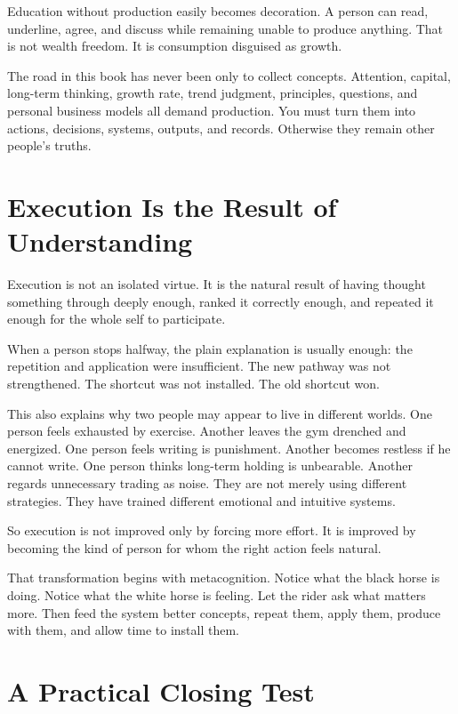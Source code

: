 Education without production easily becomes decoration. A person can read, underline, agree, and discuss while remaining unable to produce anything. That is not wealth freedom. It is consumption disguised as growth.

The road in this book has never been only to collect concepts. Attention, capital, long-term thinking, growth rate, trend judgment, principles, questions, and personal business models all demand production. You must turn them into actions, decisions, systems, outputs, and records. Otherwise they remain other people's truths.

\section*{Execution Is the Result of Understanding}

Execution is not an isolated virtue. It is the natural result of having thought something through deeply enough, ranked it correctly enough, and repeated it enough for the whole self to participate.

When a person stops halfway, the plain explanation is usually enough: the repetition and application were insufficient. The new pathway was not strengthened. The shortcut was not installed. The old shortcut won.

This also explains why two people may appear to live in different worlds. One person feels exhausted by exercise. Another leaves the gym drenched and energized. One person feels writing is punishment. Another becomes restless if he cannot write. One person thinks long-term holding is unbearable. Another regards unnecessary trading as noise. They are not merely using different strategies. They have trained different emotional and intuitive systems.

So execution is not improved only by forcing more effort. It is improved by becoming the kind of person for whom the right action feels natural.

That transformation begins with metacognition. Notice what the black horse is doing. Notice what the white horse is feeling. Let the rider ask what matters more. Then feed the system better concepts, repeat them, apply them, produce with them, and allow time to install them.

\section*{A Practical Closing Test}

